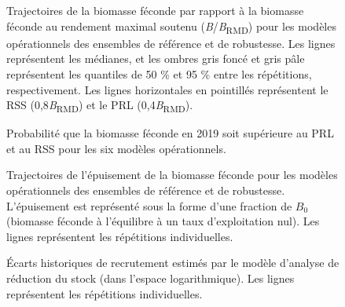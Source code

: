 \documentclass[french,11pt]{book}
\begin{document}
\begin{figure}[htb]

{\centering {} 

}

\caption{Trajectoires de la biomasse féconde par rapport à la biomasse féconde au rendement maximal soutenu (\emph{B}/\emph{B}\textsubscript{RMD}) pour les modèles opérationnels des ensembles de référence et de robustesse. Les lignes représentent les médianes, et les ombres gris foncé et gris pâle représentent les quantiles de 50 \% et 95 \% entre les répétitions, respectivement. Les lignes horizontales en pointillés représentent le RSS (0,8\emph{B}\textsubscript{RMD}) et le PRL (0,4\emph{B}\textsubscript{RMD}).}\label{fig:biomass-om}
\end{figure}

\begin{figure}[htb]

{\centering {} 

}

\caption{Probabilité que la biomasse féconde en 2019 soit supérieure au PRL et au RSS pour les six modèles opérationnels.}\label{fig:ref-pt}
\end{figure}

\begin{figure}[htb]

{\centering {} 

}

\caption{Trajectoires de l'épuisement de la biomasse féconde pour les modèles opérationnels des ensembles de référence et de robustesse. L'épuisement est représenté sous la forme d'une fraction de \(B_0\) (biomasse féconde à l'équilibre à un taux d'exploitation nul). Les lignes représentent les répétitions individuelles.}\label{fig:depletion-om}
\end{figure}

\begin{figure}[htb]

{\centering {} 

}

\caption{Écarts historiques de recrutement estimés par le modèle d'analyse de réduction du stock (dans l'espace logarithmique). Les lignes représentent les répétitions individuelles.}\label{fig:recdev-om}
\end{figure}
\end{document}
